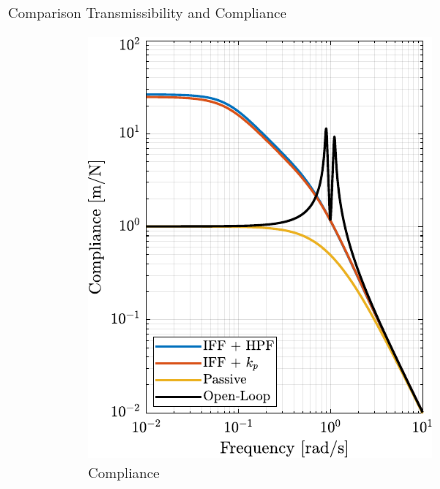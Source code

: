 \documentclass[t, minted]{clean-beamer}
\begin{document}
\begin{frame}[label={sec:orgdd42828}]{Comparison Transmissibility and Compliance}
\begin{figure}[htbp]
\begin{subfigure}[c]{0.49\linewidth}
\includegraphics[width=\linewidth]{figs/comp_compliance.pdf}
\caption{\label{fig:comp_compliance} Compliance}
\end{subfigure}
\hfill
\begin{subfigure}[c]{0.49\linewidth}

\end{subfigure}
\end{figure}
\end{frame}
\end{document}
